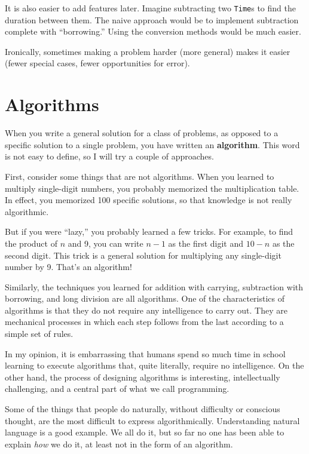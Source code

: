 It is also easier to add features later.  Imagine
subtracting two {\tt Time}s to find the duration between them.  The
naive approach would be to implement subtraction complete with
``borrowing.''  Using the conversion methods would be much easier.

Ironically, sometimes making a problem harder (more general)
makes it easier (fewer special cases, fewer opportunities for error).


\section{Algorithms}
\label{algorithm}

When you write a general solution for a class of problems, as
opposed to a specific solution to a single problem, you have
written an {\bf algorithm}.  This word is
not easy to define, so I will try a couple of approaches.

First, consider some things that are not algorithms.  When you learned
to multiply single-digit numbers, you probably memorized the
multiplication table.  In effect, you memorized 100 specific
solutions, so that knowledge is not really algorithmic.

But if you were ``lazy,'' you probably learned a few
tricks.  For example, to find the product of $n$ and 9, you can
write $n-1$ as the first digit and $10-n$ as the second digit.  This
trick is a general solution for multiplying any single-digit number by 9.
That's an algorithm!

Similarly, the techniques you learned for addition with carrying,
subtraction with borrowing, and long division are all algorithms.  One
of the characteristics of algorithms is that they do not require any
intelligence to carry out.  They are mechanical processes in which
each step follows from the last according to a simple set of rules.

In my opinion, it is embarrassing that humans spend so much
time in school learning to execute algorithms that,
quite literally, require no intelligence.
%
On the other hand, the process of designing algorithms is
interesting, intellectually challenging, and a central part
of what we call programming.

Some of the things that people do naturally, without difficulty
or conscious thought, are the most difficult to express
algorithmically.  Understanding natural language is a good
example.  We all do it, but so far no one has been able to
explain {\em how} we do it, at least not in the form of an
algorithm.

